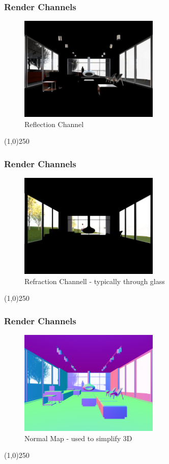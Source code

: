 \begin{frame}
\frametitle{Render Channels}
\begin{figure}
	\centering
	\includegraphics[height=5cm]{./img/Rendering/SittingRoomFinalReflection}
	\caption[Reflection Channel]{Reflection Channel}
	\label{fig:sittingroomfinalReflection}
\end{figure}
\end{frame}
\begin{center}\line(1,0){250}\end{center}

\begin{frame}
\frametitle{Render Channels}
\begin{figure}
	\centering
	\includegraphics[height=5cm]{./img/Rendering/SittingRoomFinalRefraction.png}
	\caption[Refraction Channell - typically through glass]{Refraction Channell - typically through glass}
	\label{fig:sittingroomfinalRefraction}
\end{figure}
\end{frame}
\begin{center}\line(1,0){250}\end{center}

\begin{frame}
\frametitle{Render Channels}
\begin{figure}
	\centering
	\includegraphics[height=5cm]{./img/Rendering/SittingRoomFinalNormals.png}
	\caption[Normal Map - used to simplify 3D]{Normal Map - used to simplify 3D}
	\label{fig:sittingroomfinalNormal}
\end{figure}
\end{frame}
\begin{center}\line(1,0){250}\end{center}

